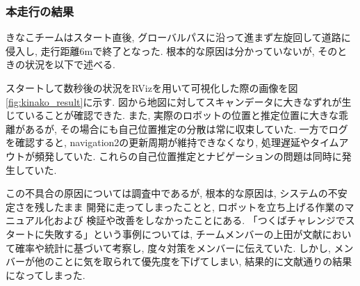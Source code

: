 \subsubsection{本走行の結果}
きなこチームはスタート直後, 
グローバルパスに沿って進まず左旋回して道路に侵入し, 
走行距離6mで終了となった. 
根本的な原因は分かっていないが, 
そのときの状況を以下で述べる. 

スタートして数秒後の状況をRVizを用いて可視化した際の画像を図\ref{fig:kinako_result}に示す.
図から地図に対してスキャンデータに大きなずれが生じていることが確認できた. 
また, 実際のロボットの位置と推定位置に大きな乖離があるが, 
その場合にも自己位置推定の分散は常に収束していた. 
一方でログを確認すると, navigation2の更新周期が維持できなくなり, 
処理遅延やタイムアウトが頻発していた.
これらの自己位置推定とナビゲーションの問題は同時に発生していた. 

この不具合の原因については調査中であるが, 
根本的な原因は, システムの不安定さを残したまま
開発に走ってしまったことと, 
ロボットを立ち上げる作業のマニュアル化および
検証や改善をしなかったことにある. 
「つくばチャレンジでスタートに失敗する」という事例については, 
チームメンバーの上田が文献\cite{上田確率}において確率や統計に基づいて考察し, 
度々対策をメンバーに伝えていた. しかし, 
メンバーが他のことに気を取られて優先度を下げてしまい, 
結果的に文献通りの結果になってしまった. 


